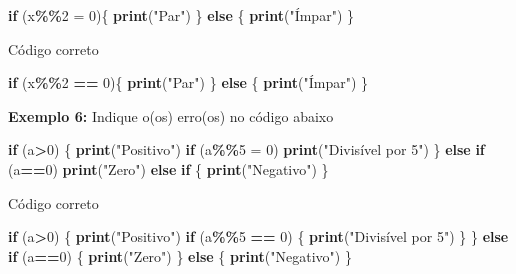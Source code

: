 \documentclass[
]{book}
\newenvironment{Shaded}{\begin{snugshade}}{\end{snugshade}}
\newcommand{\ControlFlowTok}[1]{\textcolor[rgb]{0.13,0.29,0.53}{\textbf{#1}}}
\newcommand{\DecValTok}[1]{\textcolor[rgb]{0.00,0.00,0.81}{#1}}
\newcommand{\FunctionTok}[1]{\textcolor[rgb]{0.13,0.29,0.53}{\textbf{#1}}}
\newcommand{\NormalTok}[1]{#1}
\newcommand{\OtherTok}[1]{\textcolor[rgb]{0.56,0.35,0.01}{#1}}
\newcommand{\SpecialCharTok}[1]{\textcolor[rgb]{0.81,0.36,0.00}{\textbf{#1}}}
\newcommand{\StringTok}[1]{\textcolor[rgb]{0.31,0.60,0.02}{#1}}
\begin{document}
\begin{Shaded}
\begin{Highlighting}[]
\ControlFlowTok{if}\NormalTok{ (x}\SpecialCharTok{\%\%}\DecValTok{2} \OtherTok{=} \DecValTok{0}\NormalTok{)\{  }
      \FunctionTok{print}\NormalTok{(}\StringTok{"Par"}\NormalTok{)}
\NormalTok{\} }\ControlFlowTok{else}\NormalTok{ \{  }
    \FunctionTok{print}\NormalTok{(}\StringTok{"Ímpar"}\NormalTok{)}
\NormalTok{\}}
\end{Highlighting}
\end{Shaded}

Código correto

\begin{Shaded}
\begin{Highlighting}[]
\ControlFlowTok{if}\NormalTok{ (x}\SpecialCharTok{\%\%}\DecValTok{2} \SpecialCharTok{==} \DecValTok{0}\NormalTok{)\{  }
  \FunctionTok{print}\NormalTok{(}\StringTok{"Par"}\NormalTok{)}
\NormalTok{\} }\ControlFlowTok{else}\NormalTok{ \{  }
    \FunctionTok{print}\NormalTok{(}\StringTok{"Ímpar"}\NormalTok{)}
\NormalTok{\}}
\end{Highlighting}
\end{Shaded}

\textbf{Exemplo 6:} Indique o(os) erro(os) no código abaixo

\begin{Shaded}
\begin{Highlighting}[]
\ControlFlowTok{if}\NormalTok{ (a}\SpecialCharTok{\textgreater{}}\DecValTok{0}\NormalTok{) \{  }
  \FunctionTok{print}\NormalTok{(}\StringTok{"Positivo"}\NormalTok{)  }
  \ControlFlowTok{if}\NormalTok{ (a}\SpecialCharTok{\%\%}\DecValTok{5} \OtherTok{=} \DecValTok{0}\NormalTok{)     }
    \FunctionTok{print}\NormalTok{(}\StringTok{"Divisível por 5"}\NormalTok{)    }
\NormalTok{\} }\ControlFlowTok{else} \ControlFlowTok{if}\NormalTok{ (a}\SpecialCharTok{==}\DecValTok{0}\NormalTok{)   }
    \FunctionTok{print}\NormalTok{(}\StringTok{"Zero"}\NormalTok{)}
  \ControlFlowTok{else} \ControlFlowTok{if}\NormalTok{ \{  }
    \FunctionTok{print}\NormalTok{(}\StringTok{"Negativo"}\NormalTok{)}
\NormalTok{\}}
\end{Highlighting}
\end{Shaded}

Código correto

\begin{Shaded}
\begin{Highlighting}[]
\ControlFlowTok{if}\NormalTok{ (a}\SpecialCharTok{\textgreater{}}\DecValTok{0}\NormalTok{) \{  }
  \FunctionTok{print}\NormalTok{(}\StringTok{"Positivo"}\NormalTok{)  }
  \ControlFlowTok{if}\NormalTok{ (a}\SpecialCharTok{\%\%}\DecValTok{5} \SpecialCharTok{==} \DecValTok{0}\NormalTok{) \{    }
    \FunctionTok{print}\NormalTok{(}\StringTok{"Divisível por 5"}\NormalTok{)  }
\NormalTok{  \}}
\NormalTok{\} }\ControlFlowTok{else} \ControlFlowTok{if}\NormalTok{ (a}\SpecialCharTok{==}\DecValTok{0}\NormalTok{) \{  }
    \FunctionTok{print}\NormalTok{(}\StringTok{"Zero"}\NormalTok{)}
\NormalTok{\} }\ControlFlowTok{else}\NormalTok{ \{  }
    \FunctionTok{print}\NormalTok{(}\StringTok{"Negativo"}\NormalTok{)}
\NormalTok{\}}
\end{Highlighting}
\end{Shaded}
\end{document}
